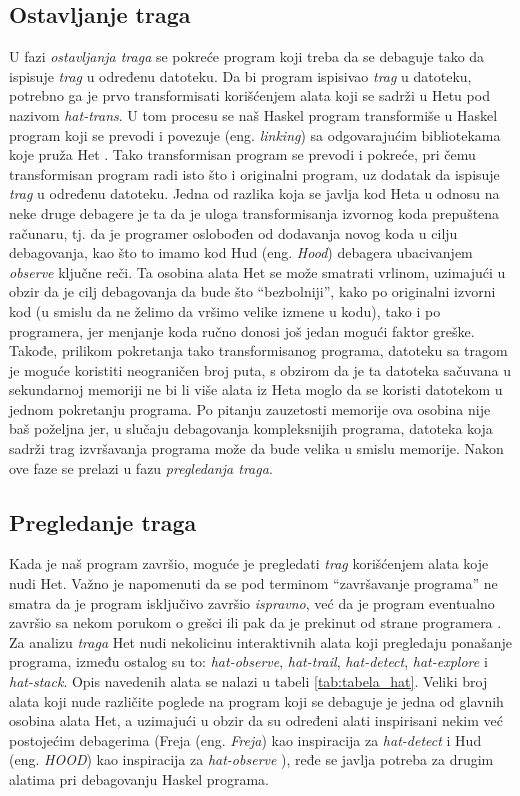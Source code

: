\documentclass[a4paper]{article}
\begin{document}
{{\subsection{Ostavljanje traga}
U fazi {\em ostavljanja traga} se pokreće program koji treba da se debaguje tako da ispisuje {\em trag} u određenu datoteku. Da bi program ispisivao {\em trag} u datoteku,
potrebno ga je prvo transformisati korišćenjem alata koji se sadrži u Hetu pod nazivom {\em hat-trans}. U tom procesu se naš Haskel program transformiše u
Haskel program koji se prevodi i povezuje (eng. {\em linking}) sa odgovarajućim bibliotekama koje pruža Het \cite{chitil2002transforming}. Tako transformisan program se prevodi i pokreće,
pri čemu transformisan program radi isto što i originalni program, uz dodatak da ispisuje {\em trag} u određenu datoteku. %
Jedna od razlika koja se javlja kod Heta u odnosu na neke druge debagere je ta da je uloga transformisanja izvornog koda prepuštena računaru, tj. da je programer oslobođen od dodavanja novog koda u cilju debagovanja, kao što to imamo kod Hud (eng. {\em Hood}) debagera ubacivanjem {\em observe} ključne reči.
Ta osobina alata Het se može smatrati vrlinom, uzimajući u obzir da je cilj debagovanja da bude što ``bezbolniji'', kako po originalni izvorni kod (u smislu da ne želimo da vršimo velike izmene u kodu), tako i po programera, jer menjanje koda ručno donosi još jedan mogući faktor greške. 
Takođe, prilikom pokretanja tako transformisanog programa, datoteku sa tragom je moguće koristiti neograničen broj puta, s obzirom da je ta datoteka sačuvana u sekundarnoj memoriji ne bi li više alata iz Heta moglo da se koristi datotekom u jednom pokretanju programa.
Po pitanju zauzetosti memorije ova osobina nije baš poželjna jer, u slučaju debagovanja kompleksnijih programa, datoteka koja sadrži trag izvršavanja programa može da bude velika u smislu memorije.
Nakon ove faze se prelazi u fazu {\em pregledanja traga}.

\subsection{Pregledanje traga}
Kada je naš program završio, moguće je pregledati {\em trag} korišćenjem alata koje nudi Het. Važno je napomenuti da se pod terminom ``završavanje programa'' ne smatra 
da je program isključivo završio {\em ispravno}, već da je program eventualno završio sa nekom porukom o grešci ili pak da je prekinut od strane programera \cite{hat_haskell_org}.
Za analizu {\em traga} Het nudi nekolicinu interaktivnih alata koji pregledaju ponašanje programa, 
između ostalog su to: {\em hat-observe}, {\em hat-trail}, {\em hat-detect}, {\em hat-explore} i {\em hat-stack}. Opis navedenih alata se nalazi u tabeli \ref{tab:tabela_hat}.
Veliki broj alata koji nude različite poglede na program koji se debaguje je jedna od glavnih osobina alata Het, a uzimajući u obzir da su određeni alati inspirisani nekim već postojećim debagerima (Freja (eng. {\em Freja}) kao inspiracija za {\em hat-detect} i Hud (eng. {\em HOOD}) kao inspiracija za {\em hat-observe} \cite{hat_haskell_org}), ređe se javlja potreba za drugim alatima pri debagovanju Haskel programa.

}}
\end{document}
